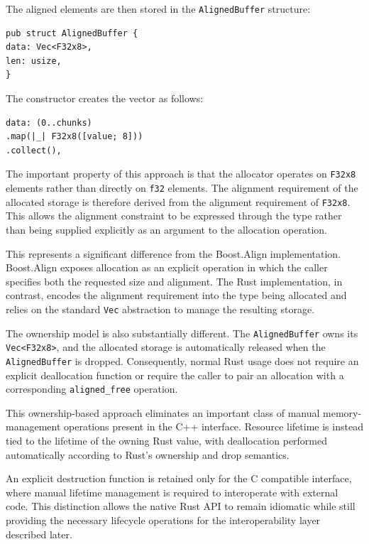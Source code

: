 The aligned elements are then stored in the \lstinline|AlignedBuffer|
structure:

\begin{lstlisting}[style=rustblock]
pub struct AlignedBuffer {
data: Vec<F32x8>,
len: usize,
}
\end{lstlisting}

The constructor creates the vector as follows:

\begin{lstlisting}[style=rustblock]
data: (0..chunks)
.map(|_| F32x8([value; 8]))
.collect(),
\end{lstlisting}

The important property of this approach is that the allocator operates on \lstinline|F32x8| elements rather than 
directly on \lstinline|f32| elements. The alignment requirement of the allocated storage is therefore derived from 
the alignment requirement of \lstinline|F32x8|. This allows the alignment constraint to be expressed
through the type rather than being supplied explicitly as an argument to the allocation operation.

This represents a significant difference from the Boost.Align implementation. 
Boost.Align exposes allocation as an explicit operation in which the caller specifies both the requested size 
and alignment. The Rust implementation, in contrast, encodes the alignment requirement
into the type being allocated and relies on the standard \lstinline|Vec| abstraction to manage the resulting storage.

The ownership model is also substantially different. The \lstinline|AlignedBuffer| owns its \lstinline|Vec<F32x8>|, 
and the allocated storage is automatically released when the \lstinline|AlignedBuffer| is dropped. 
Consequently, normal Rust usage does not require an explicit deallocation function or require the caller
to pair an allocation with a corresponding \lstinline|aligned_free| operation.

This ownership-based approach eliminates an important class of manual memory-management operations present in the 
C++ interface. Resource lifetime is instead tied to the lifetime of the owning Rust value, with deallocation performed 
automatically according to Rust's ownership and drop semantics.

An explicit destruction function is retained only for the C compatible interface, where manual lifetime management is 
required to interoperate with external code. This distinction allows the native Rust API to remain idiomatic while 
still providing the necessary lifecycle operations for the interoperability layer described later.

